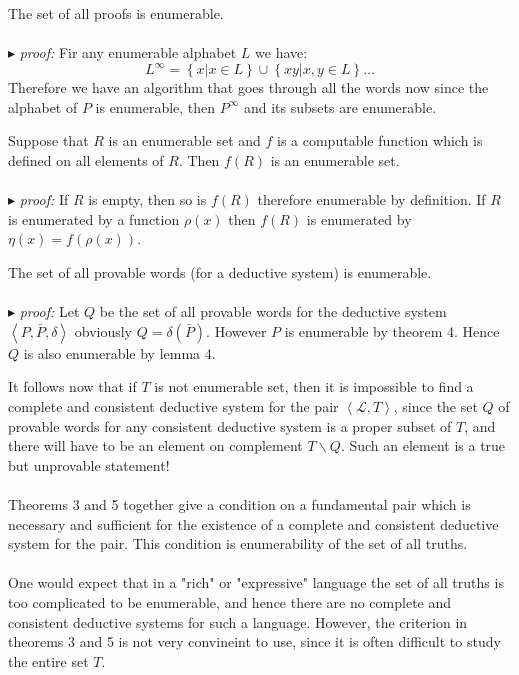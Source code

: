 \documentclass[10pt,a4paper]{article}
\newcounter{theo}
\newcommand{\curveL}{\mathcal{L}}
\newcommand{\proof}{\\ \ \\ $\blacktriangleright$ \textit{proof: }}
\begin{document}
                        \begin{theorem}
                            The set of all proofs is enumerable.
                            \proof Fir any enumerable alphabet $L$ we have:
                            \begin{equation}
                                L^\infty = \left\{x | x\in L\right\} \cup \left\{xy|x,y\in L\right\}\dots
                            \end{equation}
                            Therefore we have an algorithm that goes through all the words now since the alphabet of $P$ is enumerable, then $P^\infty$ and its subsets are enumerable.
                        \end{theorem}
                        \begin{lemma}
                            Suppose that $R$ is an enumerable set and $f$ is a computable function which is defined on all elements of $R$. Then $f(R)$ is an enumerable set.
                            \proof If $R$ is empty, then so is $f(R)$ therefore enumerable by definition. If $R$ is enumerated by a function $\rho(x)$ then $f(R)$ is enumerated by $\eta(x) = f(\rho(x))$.
                        \end{lemma}
                        \begin{theorem}
                            The set of all provable words (for a deductive system) is enumerable.
                            \proof Let $Q$ be the set of all provable words for the deductive system $\left<P, \bar P, \delta\right>$  obviously $Q = \delta(\bar P)$. However $P$ is enumerable by theorem 4. Hence $Q$ is also enumerable by lemma 4.
                        \end{theorem}
                        It follows now that if $T$ is not enumerable set, then it is impossible to find a complete and consistent deductive system for the pair $\left< \curveL,T\right>$, since the set $Q$ of provable words for any consistent deductive system is a proper subset of $T$, and there will have to be an element on complement $T\backslash Q$. Such an element is a true but unprovable statement!
                        \\
                        \\
                        Theorems 3 and 5 together give a condition on a fundamental pair which is necessary and sufficient for the existence of a complete and consistent deductive system for the pair. This condition is enumerability of the set of all truths. 
                        \\
                        \\
                        One would expect that in a "rich" or "expressive" language the set of all truths is too complicated to be enumerable, and hence there are no complete and consistent deductive systems for such a language. However, the criterion in theorems 3 and 5 is not very convineint to use, since it is often difficult to study the entire set $T$. 
\end{document}
